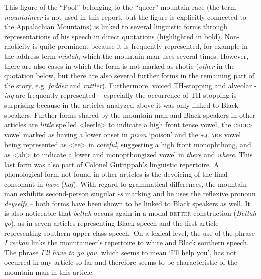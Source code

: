 This figure of the “Pool” belonging to the “queer” mountain race (the term \textit{mountaineer} is not used in this report, but the figure is explicitly connected to the Appalachian Mountains) is linked to several linguistic forms through representations of his speech in direct quotations (highlighted in bold). Non-rhoticity is quite prominent because it is frequently represented, for example in the address term \emph{mistah}, which the mountain man uses several times. However, there are also cases in which the form is not marked as rhotic (\emph{other} in the quotation below, but there are also several further forms in the remaining part of the story, e.g. \emph{fadder} and \emph{rattler}). Furthermore, voiced TH-stopping and alveolar -\emph{ing} are frequently represented – especially the occurrence of TH-stopping is surprising because in the articles analyzed above it was only linked to Black speakers. Further forms shared by the mountain man and Black speakers in other articles are \emph{little} spelled <leetle> to indicate a high front tense vowel, the \textsc{choice} vowel marked as having a lower onset in \emph{pizon} ‘poison’ and the \textsc{square} vowel being represented as <ee> in \emph{careful}, suggesting a high front monophthong, and as <ah> to indicate a lower and monopthongized vowel in \emph{there} and \emph{where}. This last form was also part of Colonel Gutrippah’s linguistic repertoire. A phonological form not found in other articles is the devoicing of the final consonant in \emph{have} (\emph{haf}). With regard to grammatical differences, the mountain man exhibits second-person singular -\emph{s} marking and he uses the reflexive pronoun \emph{deyselfs} – both forms have been shown to be linked to Black speakers as well. It is also noticeable that \emph{bettah} occurs again in a modal \textsc{better} construction (\emph{Bettah go}), as in seven articles representing Black speech and the first article representing southern upper-class speech. On a lexical level, the use of the phrase \emph{I reckon} links the mountaineer’s repertoire to white and Black southern speech. The phrase\emph{ I’ll have to go you}, which seems to mean ‘I’ll help you’, has not occurred in any article so far and therefore seems to be characteristic of the mountain man in this article.

